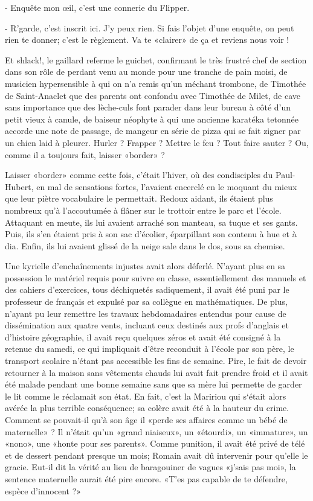 - Enquête mon œil, c’est une connerie du Flipper.

- R’garde, c’est inscrit ici. J’y peux rien. Si fais l’objet d’une enquête, on peut rien te donner; c’est le règlement. Va te «clairer» de ça et reviens nous voir !

Et shlack!, le gaillard referme le guichet, confirmant le très frustré chef de section dans son rôle de perdant venu au monde pour une tranche de pain moisi, de musicien hypersensible à qui on n’a remis qu’un méchant trombone, de Timothée de Saint-Anaclet que des parents ont confondu avec Timothée de Milet, de cave sans importance que des lèche-culs font parader dans leur bureau à côté d’un petit vieux à canule, de baiseur néophyte à qui une ancienne karatéka tetonnée accorde une note de passage, de mangeur en série de pizza qui se fait zigner par un chien laid à pleurer. Hurler ? Frapper ? Mettre le feu ? Tout faire sauter ? Ou, comme il a toujours fait, laisser «border» ?

Laisser «border» comme cette fois, c’était l’hiver, où des condisciples du Paul-Hubert, en mal de sensations fortes, l’avaient encerclé en le moquant du mieux que leur piètre vocabulaire le permettait. Redoux aidant, ils étaient plus nombreux qu’à l’accoutumée à flâner sur le trottoir entre le parc et l’école. Attaquant en meute, ils lui avaient arraché son manteau, sa tuque et ses gants. Puis, ils s’en étaient pris à son sac d’écolier, éparpillant son contenu à hue et à dia. Enfin, ils lui avaient glissé de la neige sale dans le dos, sous sa chemise.

Une kyrielle d’enchaînements injustes avait alors déferlé. N’ayant plus en sa possession le matériel requis pour suivre en classe, essentiellement des manuels et des cahiers d’exercices, tous déchiquetés sadiquement, il avait été puni par le professeur de français et expulsé par sa collègue en mathématiques. De plus, n’ayant pu leur remettre les travaux hebdomadaires entendus pour cause de dissémination aux quatre vents, incluant ceux destinés aux profs d’anglais et d’histoire géographie, il avait reçu quelques zéros et avait été consigné à la retenue du samedi, ce qui impliquait d’être reconduit à l’école par son père, le transport scolaire n’étant pas accessible les fins de semaine. Pire, le fait de devoir retourner à la maison sans vêtements chauds lui avait fait prendre froid et il avait été malade pendant une bonne semaine sans que sa mère lui permette de garder le lit comme le réclamait son état. En fait, c’est la Maririou qui s‘était alors avérée la plus terrible conséquence; sa colère avait été à la hauteur du crime. Comment se pouvait-il qu’à son âge il «perde ses affaires comme un bébé de maternelle» ? Il n’était qu’un «grand niaiseux», un «étourdi», un «immature», un «nono», une «honte pour ses parents». Comme punition, il avait été privé de télé et de dessert pendant presque un mois; Romain avait dû intervenir pour qu’elle le gracie. Eut-il dit la vérité au lieu de baragouiner de vagues «j’sais pas moi», la sentence maternelle aurait été pire encore. «T’es pas capable de te défendre, espèce d’innocent ?»


